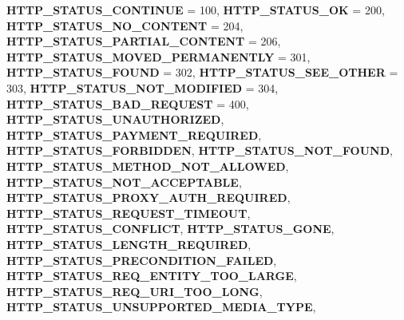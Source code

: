 \begin{DoxyCompactItemize}
{\bfseries H\+T\+T\+P\+\_\+\+S\+T\+A\+T\+U\+S\+\_\+\+C\+O\+N\+T\+I\+N\+UE} = 100, 
{\bfseries H\+T\+T\+P\+\_\+\+S\+T\+A\+T\+U\+S\+\_\+\+OK} = 200, 
\newline
{\bfseries H\+T\+T\+P\+\_\+\+S\+T\+A\+T\+U\+S\+\_\+\+N\+O\+\_\+\+C\+O\+N\+T\+E\+NT} = 204, 
{\bfseries H\+T\+T\+P\+\_\+\+S\+T\+A\+T\+U\+S\+\_\+\+P\+A\+R\+T\+I\+A\+L\+\_\+\+C\+O\+N\+T\+E\+NT} = 206, 
{\bfseries H\+T\+T\+P\+\_\+\+S\+T\+A\+T\+U\+S\+\_\+\+M\+O\+V\+E\+D\+\_\+\+P\+E\+R\+M\+A\+N\+E\+N\+T\+LY} = 301, 
{\bfseries H\+T\+T\+P\+\_\+\+S\+T\+A\+T\+U\+S\+\_\+\+F\+O\+U\+ND} = 302, 
\newline
{\bfseries H\+T\+T\+P\+\_\+\+S\+T\+A\+T\+U\+S\+\_\+\+S\+E\+E\+\_\+\+O\+T\+H\+ER} = 303, 
{\bfseries H\+T\+T\+P\+\_\+\+S\+T\+A\+T\+U\+S\+\_\+\+N\+O\+T\+\_\+\+M\+O\+D\+I\+F\+I\+ED} = 304, 
{\bfseries H\+T\+T\+P\+\_\+\+S\+T\+A\+T\+U\+S\+\_\+\+B\+A\+D\+\_\+\+R\+E\+Q\+U\+E\+ST} = 400, 
{\bfseries H\+T\+T\+P\+\_\+\+S\+T\+A\+T\+U\+S\+\_\+\+U\+N\+A\+U\+T\+H\+O\+R\+I\+Z\+ED}, 
\newline
{\bfseries H\+T\+T\+P\+\_\+\+S\+T\+A\+T\+U\+S\+\_\+\+P\+A\+Y\+M\+E\+N\+T\+\_\+\+R\+E\+Q\+U\+I\+R\+ED}, 
{\bfseries H\+T\+T\+P\+\_\+\+S\+T\+A\+T\+U\+S\+\_\+\+F\+O\+R\+B\+I\+D\+D\+EN}, 
{\bfseries H\+T\+T\+P\+\_\+\+S\+T\+A\+T\+U\+S\+\_\+\+N\+O\+T\+\_\+\+F\+O\+U\+ND}, 
{\bfseries H\+T\+T\+P\+\_\+\+S\+T\+A\+T\+U\+S\+\_\+\+M\+E\+T\+H\+O\+D\+\_\+\+N\+O\+T\+\_\+\+A\+L\+L\+O\+W\+ED}, 
\newline
{\bfseries H\+T\+T\+P\+\_\+\+S\+T\+A\+T\+U\+S\+\_\+\+N\+O\+T\+\_\+\+A\+C\+C\+E\+P\+T\+A\+B\+LE}, 
{\bfseries H\+T\+T\+P\+\_\+\+S\+T\+A\+T\+U\+S\+\_\+\+P\+R\+O\+X\+Y\+\_\+\+A\+U\+T\+H\+\_\+\+R\+E\+Q\+U\+I\+R\+ED}, 
{\bfseries H\+T\+T\+P\+\_\+\+S\+T\+A\+T\+U\+S\+\_\+\+R\+E\+Q\+U\+E\+S\+T\+\_\+\+T\+I\+M\+E\+O\+UT}, 
{\bfseries H\+T\+T\+P\+\_\+\+S\+T\+A\+T\+U\+S\+\_\+\+C\+O\+N\+F\+L\+I\+CT}, 
\newline
{\bfseries H\+T\+T\+P\+\_\+\+S\+T\+A\+T\+U\+S\+\_\+\+G\+O\+NE}, 
{\bfseries H\+T\+T\+P\+\_\+\+S\+T\+A\+T\+U\+S\+\_\+\+L\+E\+N\+G\+T\+H\+\_\+\+R\+E\+Q\+U\+I\+R\+ED}, 
{\bfseries H\+T\+T\+P\+\_\+\+S\+T\+A\+T\+U\+S\+\_\+\+P\+R\+E\+C\+O\+N\+D\+I\+T\+I\+O\+N\+\_\+\+F\+A\+I\+L\+ED}, 
{\bfseries H\+T\+T\+P\+\_\+\+S\+T\+A\+T\+U\+S\+\_\+\+R\+E\+Q\+\_\+\+E\+N\+T\+I\+T\+Y\+\_\+\+T\+O\+O\+\_\+\+L\+A\+R\+GE}, 
\newline
{\bfseries H\+T\+T\+P\+\_\+\+S\+T\+A\+T\+U\+S\+\_\+\+R\+E\+Q\+\_\+\+U\+R\+I\+\_\+\+T\+O\+O\+\_\+\+L\+O\+NG}, 
{\bfseries H\+T\+T\+P\+\_\+\+S\+T\+A\+T\+U\+S\+\_\+\+U\+N\+S\+U\+P\+P\+O\+R\+T\+E\+D\+\_\+\+M\+E\+D\+I\+A\+\_\+\+T\+Y\+PE}, 

\end{DoxyCompactItemize}
